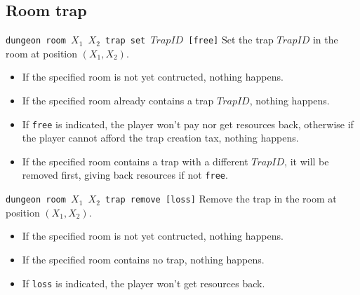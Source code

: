\documentclass[10pt,a4paper]{scrartcl}
\newenvironment{apiCode}[1]
{ \begin{lrbox}{\mybox} \begin{minipage}{0.9\textwidth} {\color{Mahogany} \small\texttt{#1}} \vspace{8pt} \newline }
{ \end{minipage} \end{lrbox}\fbox{\usebox{\mybox}} \newline\vspace{4pt}\newline }
\begin{document}
\subsection{Room trap}
\begin{apiCode}{dungeon room $X_1$ $X_2$ trap set $TrapID$ [free]}
Set the trap $TrapID$ in the room at position $(X_1, X_2)$.
\begin{itemize}
\itemsep 0em
\item If the specified room is not yet contructed, nothing happens.
\item If the specified room already contains a trap $TrapID$, nothing happens.
\item If \verb#free# is indicated, the player won't pay nor get resources back,\newline
	  otherwise if the player cannot afford the trap creation tax, nothing happens.
\item If the specified room contains a trap with a different $TrapID$, it will be removed first,\newline
	  giving back resources if not \verb#free#.
\end{itemize}
\end{apiCode}
\begin{apiCode}{dungeon room $X_1$ $X_2$ trap remove [loss]}
Remove the trap in the room at position $(X_1, X_2)$.
\begin{itemize}
\itemsep 0em
\item If the specified room is not yet contructed, nothing happens.
\item If the specified room contains no trap, nothing happens.
\item If \verb#loss# is indicated, the player won't get resources back.
\end{itemize}
\end{apiCode}
\end{document}
